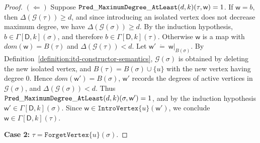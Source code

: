 \documentclass[11pt,a4paper]{article}
\newcommand{\truevalue}{1}
\newcommand{\treewidthvalue}{k}
\newcommand{\decompositiongraph}[1]{\mathcal{G}(#1)}
\newcommand{\maxDegree}{\Delta}
\newcommand{\introvertextype}[1]{\mathtt{IntroVertex}\{#1\}}
\newcommand{\forgetvertextype}[1]{\mathtt{ForgetVertex}\{#1\}}
\newcommand{\topbagname}{B}
\newcommand{\topbag}[1]{\topbagname(#1)}
\newcommand{\abstractdecomposition}{\tau}
\newcommand{\sigmaabstractdecomposition}{\sigma}
\newcommand{\defeq}{~\dot{=}~}
\newcommand{\vertexone}{u}
\newcommand{\awitness}{\mathsf{w}}
\newcommand{\dpcore}{\mathsf{D}}
\newcommand{\dpNamePart}[1]{\mbox{\normalfont\ttfamily #1}}
\newcommand{\predicateMaxDegree}[2]{\dpNamePart{Pred}\_\allowbreak\dpNamePart{MaximumDegree}\_\allowbreak\dpNamePart{AtLeast}(#1,#2)}
\newcommand{\dynamizationfunctionname}[1]{\Gamma[{#1}]}
\newcommand{\dynamizationfunction}[2]{\dynamizationfunctionname{#1,#2}}
\newcommand{\domain}{dom}
\newcommand{\maxdegreeparameter}{d}
\newcommand{\maxdegreefound}{b}
\newcommand{\mxdp}{\predicateMaxDegree{\maxdegreeparameter}{\treewidthvalue}}
\begin{document}
{\begin{proof}
$(\Leftarrow)$ Suppose $\mxdp(\abstractdecomposition,\awitness)=\truevalue$. If $\awitness=\maxdegreefound$, then $\maxDegree(\decompositiongraph{\abstractdecomposition})\ge \maxdegreeparameter$, and since introducing an isolated vertex does not decrease maximum degree, we have $\maxDegree(\decompositiongraph{\sigmaabstractdecomposition})\ge \maxdegreeparameter$. By the induction hypothesis, $\maxdegreefound\in \dynamizationfunction{\dpcore}{\treewidthvalue}\allowbreak(\sigmaabstractdecomposition)$, and therefore $\maxdegreefound\in \dynamizationfunction{\dpcore}{\treewidthvalue}\allowbreak(\abstractdecomposition)$. Otherwise $\awitness$ is a map with $\domain(\awitness)=\topbag{\abstractdecomposition}$ and $\maxDegree(\decompositiongraph{\abstractdecomposition})<\maxdegreeparameter$. Let $\awitness'\defeq \awitness|_{\topbag{\sigmaabstractdecomposition}}$. By Definition~\ref{definition:itd-constructor-semantics}, $\decompositiongraph{\sigmaabstractdecomposition}$ is obtained by deleting the new isolated vertex, and $\topbag{\abstractdecomposition}=\topbag{\sigmaabstractdecomposition}\cup\{\vertexone\}$ with the new vertex having degree $0$. Hence $\domain(\awitness')=\topbag{\sigmaabstractdecomposition}$, $\awitness'$ records the degrees of active vertices in $\decompositiongraph{\sigmaabstractdecomposition}$, and $\maxDegree(\decompositiongraph{\sigmaabstractdecomposition})<\maxdegreeparameter$. Thus $\mxdp(\sigmaabstractdecomposition,\awitness')=\truevalue$, and by the induction hypothesis $\awitness'\in \dynamizationfunction{\dpcore}{\treewidthvalue}\allowbreak(\sigmaabstractdecomposition)$. Since $\awitness\in \introvertextype{\vertexone}(\awitness')$, we conclude $\awitness\in \dynamizationfunction{\dpcore}{\treewidthvalue}\allowbreak(\abstractdecomposition)$.

\medskip
\noindent\textbf{Case 2:} $\abstractdecomposition=\forgetvertextype{\vertexone}(\sigmaabstractdecomposition)$.


\end{proof}}
\end{document}
